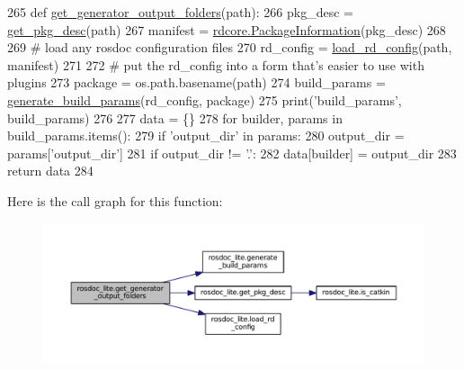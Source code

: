 \begin{DoxyCode}
265 \textcolor{keyword}{def }\hyperlink{namespacerosdoc__lite_a6989fe38bd215d8c83b7d0a1a86aa600}{get\_generator\_output\_folders}(path):
266     pkg\_desc = \hyperlink{namespacerosdoc__lite_a1bd136953d9747e7e0ac2471b48e9030}{get\_pkg\_desc}(path)
267     manifest = \hyperlink{classrosdoc__lite_1_1rdcore_1_1PackageInformation}{rdcore.PackageInformation}(pkg\_desc)
268 
269     \textcolor{comment}{# load any rosdoc configuration files}
270     rd\_config = \hyperlink{namespacerosdoc__lite_a6fc9bd97d3d23ecd8dcb06dcc5b32f73}{load\_rd\_config}(path, manifest)
271 
272     \textcolor{comment}{# put the rd\_config into a form that's easier to use with plugins}
273     package = os.path.basename(path)
274     build\_params = \hyperlink{namespacerosdoc__lite_a7a0d37797437270150ffb62125868be6}{generate\_build\_params}(rd\_config, package)
275     print(\textcolor{stringliteral}{'build\_params'}, build\_params)
276 
277     data = \{\}
278     \textcolor{keywordflow}{for} builder, params \textcolor{keywordflow}{in} build\_params.items():
279         \textcolor{keywordflow}{if} \textcolor{stringliteral}{'output\_dir'} \textcolor{keywordflow}{in} params:
280             output\_dir = params[\textcolor{stringliteral}{'output\_dir'}]
281             \textcolor{keywordflow}{if} output\_dir != \textcolor{stringliteral}{'.'}:
282                 data[builder] = output\_dir
283     \textcolor{keywordflow}{return} data
284 \end{DoxyCode}


Here is the call graph for this function\+:
\nopagebreak
\begin{figure}[H]
\begin{center}
\leavevmode
\includegraphics[width=350pt]{namespacerosdoc__lite_a6989fe38bd215d8c83b7d0a1a86aa600_cgraph}
\end{center}
\end{figure}


